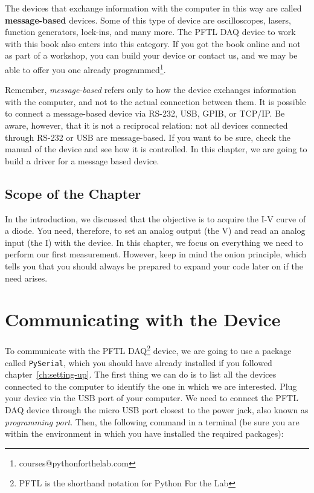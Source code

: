 The devices that exchange information with the computer in this way are called \textbf{message-based} devices. Some of this type of device are oscilloscopes, lasers, function generators, lock-ins, and many more. The {PFTL DAQ} device to work with this book also enters into this category. If you got the book online and not as part of a workshop, you can build your device or contact us, and we may be able to offer you one already programmed\footnote{courses@pythonforthelab.com}.


Remember, \textit{message-based} refers only to how the device exchanges information with the computer, and not to the actual connection between them. It is possible to connect a message-based device via RS-232, USB, GPIB, or TCP/IP. Be aware, however, that it is not a reciprocal relation: not all devices connected through RS-232 or USB are message-based. If you want to be sure, check the manual of the device and see how it is controlled. In this chapter, we are going to build a driver for a message based device.

\subsection{Scope of the Chapter}\label{subsec:scope-of-the-chapter}
In the introduction, we discussed that the objective is to acquire the I-V curve of a diode. You need, therefore, to set an analog output (the V) and read an analog input (the I) with the device. In this chapter, we focus
on everything we need to perform our first measurement. However, keep in mind the onion principle, which tells you that you should always be prepared to expand your code later on if the need arises.

\section{Communicating with the Device}\label{sec:message-basedevices}
To communicate with the {PFTL DAQ}\footnote{PFTL is the shorthand notation for Python For the Lab} device, we are going to use a package called \texttt{PySerial}, which you should have already installed if you followed chapter~\ref{ch:setting-up}. The first thing we can do is to list all the devices connected to the computer to identify the one in which we are interested. Plug your device via the USB port of your computer. We need to connect the {PFTL DAQ} device through the micro USB port closest to the power jack, also known as \emph{programming port}. Then, the following command in a terminal (be sure you are within the environment in which you have installed the required packages):


